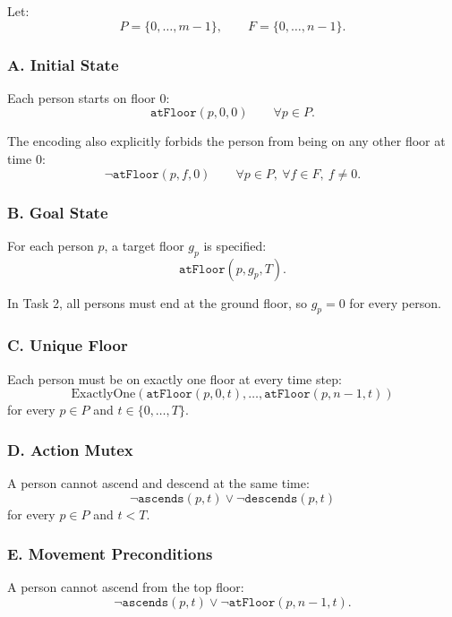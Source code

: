 \noindent Let:
\[
    P = \{0,\ldots,m-1\}, \qquad F = \{0,\ldots,n-1\}.
\]

\subsubsection*{A. Initial State}

Each person starts on floor $0$:
\[
    \texttt{atFloor}(p,0,0)
    \qquad \forall p \in P.
\]

\noindent The encoding also explicitly forbids the person from being on any other floor at time $0$:
\[
    \neg \texttt{atFloor}(p,f,0)
    \qquad \forall p \in P,\ \forall f \in F,\ f \neq 0.
\]

\subsubsection*{B. Goal State}

For each person $p$, a target floor $g_p$ is specified:
\[
    \texttt{atFloor}(p,g_p,T).
\]

\noindent In Task 2, all persons must end at the ground floor, so $g_p = 0$ for every person.

\subsubsection*{C. Unique Floor}

Each person must be on exactly one floor at every time step:
\[
    \text{ExactlyOne}\left(
                         \texttt{atFloor}(p,0,t),
                         \ldots,
                         \texttt{atFloor}(p,n-1,t)
    \right)
\]
for every $p \in P$ and $t \in \{0,\ldots,T\}$.

\subsubsection*{D. Action Mutex}

A person cannot ascend and descend at the same time:
\[
    \neg \texttt{ascends}(p,t) \lor \neg \texttt{descends}(p,t)
\]
for every $p \in P$ and $t < T$.

\subsubsection*{E. Movement Preconditions}

A person cannot ascend from the top floor:
\[
    \neg \texttt{ascends}(p,t)
    \lor
    \neg \texttt{atFloor}(p,n-1,t).
\]

